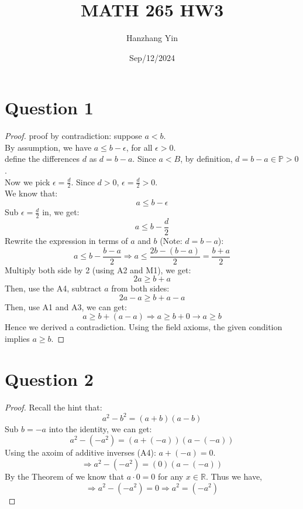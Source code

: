 \documentclass{article}
\title{MATH 265 HW3}
\author{Hanzhang Yin}
\date{Sep/12/2024}
\begin{document}
\maketitle

\section*{Question 1}
\begin{proof}
    proof by contradiction: suppose $a < b$.
    \\
    By assumption, we have $a \leq b - \epsilon$, for all $\epsilon > 0$.
    \\
    define the differences $d$ as $d = b - a$. Since $a < B$, by definition, $d = b - a \in \mathbb{P} > 0$.
    \\
    Now we pick $\epsilon = \frac{d}{2}$. Since $d > 0$, $\epsilon = \frac{d}{2} > 0$.
    \\
    We know that:
    \[ a \leq b - \epsilon \]
    Sub $\epsilon = \frac{d}{2}$ in, we get:
    \[ a \leq b - \frac{d}{2} \]
    Rewrite the expression in terms of $a$ and $b$ (Note: $d = b - a$):
    \[ a \leq b - \frac{b - a}{2} \Rightarrow a \leq \frac{2b - (b - a)}{2} = \frac{b + a}{2} \]
    Multiply both side by 2 (using A2 and M1), we get:
    \[ 2a \geq b + a \]
    Then, use the A4, subtract $a$ from both sides:
    \[ 2a - a \geq b + a - a \]
    Then, use A1 and A3, we can get:
    \[ a \geq b + (a - a) \Rightarrow a \geq b + 0 \rightarrow a \geq b \]
    Hence we derived a contradiction. Using the field axioms, the given condition implies $a \geq b$.
\end{proof}

\newpage

\section*{Question 2}
\begin{proof}
    Recall the hint that:
    \[ a^2 - b^2 = (a + b)(a - b) \]
    Sub $b = -a$ into the identity, we can get:
    \[ a^2 - (-a^2) = (a + (-a))(a - (-a)) \]
    Using the axoim of additive inverses (A4): $a + (-a) = 0$.
    \[ \Rightarrow a^2 - (-a^2) = (0)(a - (-a)) \]
    By the Theorem of we know that $a \cdot 0 = 0$ for any $x \in \mathbb{R}$. Thus we have,
    \[ \Rightarrow a^2 - (-a^2) = 0 \Rightarrow a^2  = (-a^2) \]
\end{proof}

\newpage
\end{document}
